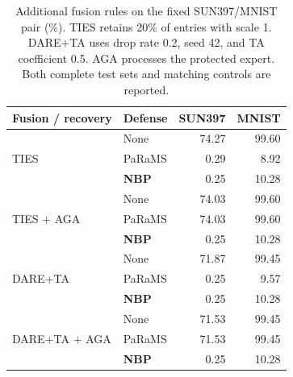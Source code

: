 \begin{table}[!t]
\centering
\small
\setlength{\tabcolsep}{4pt}
\caption{Additional fusion rules on the fixed SUN397/MNIST pair (\%). TIES retains 20\% of entries with scale 1. DARE+TA uses drop rate 0.2, seed 42, and TA coefficient 0.5. AGA processes the protected expert. Both complete test sets and matching controls are reported.}
\label{tab:fusion}
\begin{tabular}{llrr}
\toprule
Fusion / recovery & Defense & SUN397 & MNIST \\
\midrule
\multirow{3}{*}{TIES} & None & 74.27 & 99.60 \\
 & PaRaMS & 0.29 & 8.92 \\
 & \textbf{NBP} & 0.25 & 10.28 \\
\midrule
\multirow{3}{*}{TIES + AGA} & None & 74.03 & 99.60 \\
 & PaRaMS & 74.03 & 99.60 \\
 & \textbf{NBP} & 0.25 & 10.28 \\
\midrule
\multirow{3}{*}{DARE+TA} & None & 71.87 & 99.45 \\
 & PaRaMS & 0.25 & 9.57 \\
 & \textbf{NBP} & 0.25 & 10.28 \\
\midrule
\multirow{3}{*}{DARE+TA + AGA} & None & 71.53 & 99.45 \\
 & PaRaMS & 71.53 & 99.45 \\
 & \textbf{NBP} & 0.25 & 10.28 \\
\bottomrule
\end{tabular}
\end{table}
